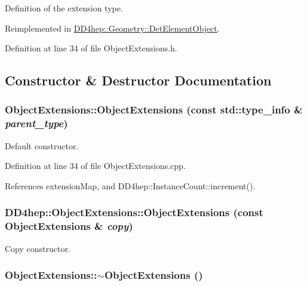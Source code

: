 Definition of the extension type. 

Reimplemented in \hyperlink{class_d_d4hep_1_1_geometry_1_1_det_element_object_ac74df66a49fc20d985f033a063b7dbab}{DD4hep::Geometry::DetElementObject}.

Definition at line 34 of file ObjectExtensions.h.

\subsection{Constructor \& Destructor Documentation}
\hypertarget{class_d_d4hep_1_1_object_extensions_adb8a89136b702583d0fa502218592696}{
\subsubsection[{ObjectExtensions}]{\setlength{\rightskip}{0pt plus 5cm}ObjectExtensions::ObjectExtensions (const std::type\_\-info \& {\em parent\_\-type})}}
\label{class_d_d4hep_1_1_object_extensions_adb8a89136b702583d0fa502218592696}


Default constructor. 

Definition at line 34 of file ObjectExtensions.cpp.

References extensionMap, and DD4hep::InstanceCount::increment().\hypertarget{class_d_d4hep_1_1_object_extensions_aabd85a7246f24434443c1bb739b6bdbc}{
\subsubsection[{ObjectExtensions}]{\setlength{\rightskip}{0pt plus 5cm}DD4hep::ObjectExtensions::ObjectExtensions (const {\bf ObjectExtensions} \& {\em copy})}}
\label{class_d_d4hep_1_1_object_extensions_aabd85a7246f24434443c1bb739b6bdbc}


Copy constructor. \hypertarget{class_d_d4hep_1_1_object_extensions_a95f9b15025fc24b02bbda235ed888f4d}{
\subsubsection[{$\sim$ObjectExtensions}]{\setlength{\rightskip}{0pt plus 5cm}ObjectExtensions::$\sim$ObjectExtensions ()}}
\label{class_d_d4hep_1_1_object_extensions_a95f9b15025fc24b02bbda235ed888f4d}


